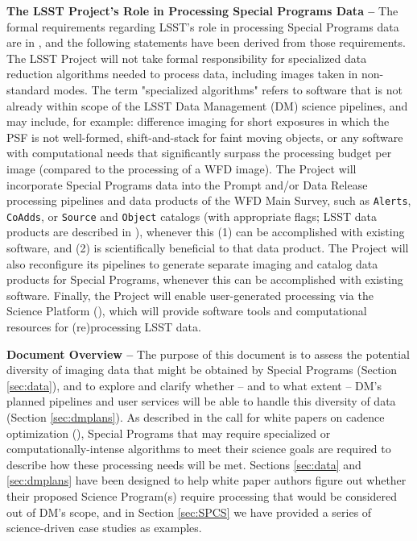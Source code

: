 \documentclass[DM,lsstdoc,toc]{lsstdoc}
\begin{document}
{\bf The LSST Project's Role in Processing Special Programs Data -- } The formal requirements regarding LSST's role in processing Special Programs data are in , and the following statements have been derived from those requirements. The LSST Project will not take formal responsibility for specialized data reduction algorithms needed to process data, including images taken in non-standard modes. The term "specialized algorithms" refers to software that is not already within scope of the LSST Data Management (DM) science pipelines, and may include, for example: difference imaging for short exposures in which the PSF is not well-formed, shift-and-stack for faint moving objects, or any software with computational needs that significantly surpass the processing budget per image (compared to the processing of a WFD image). The Project will incorporate Special Programs data into the Prompt and/or Data Release processing pipelines and data products of the WFD Main Survey, such as {\tt Alerts}, {\tt CoAdds}, or {\tt Source} and {\tt Object} catalogs (with appropriate flags; LSST data products are described in ), whenever this (1) can be accomplished with existing software, and (2) is scientifically beneficial to that data product. The Project will also reconfigure its pipelines to generate separate imaging and catalog data products for Special Programs, whenever this can be accomplished with existing software. Finally, the Project will enable user-generated processing via the Science Platform (), which will provide software tools and computational resources for (re)processing LSST data.

{\bf Document Overview -- } The purpose of this document is to assess the potential diversity of imaging data that might be obtained by Special Programs (Section \ref{sec:data}), and to explore and clarify whether -- and to what extent -- DM's planned pipelines and user services will be able to handle this diversity of data (Section \ref{sec:dmplans}). As described in the call for white papers on cadence optimization (), Special Programs that may require specialized or computationally-intense algorithms to meet their science goals are required to describe how these processing needs will be met. Sections \ref{sec:data} and \ref{sec:dmplans} have been designed to help white paper authors figure out whether their proposed Science Program(s) require processing that would be considered out of DM's scope, and in Section \ref{sec:SPCS} we have provided a series of science-driven case studies as examples. 
\end{document}
